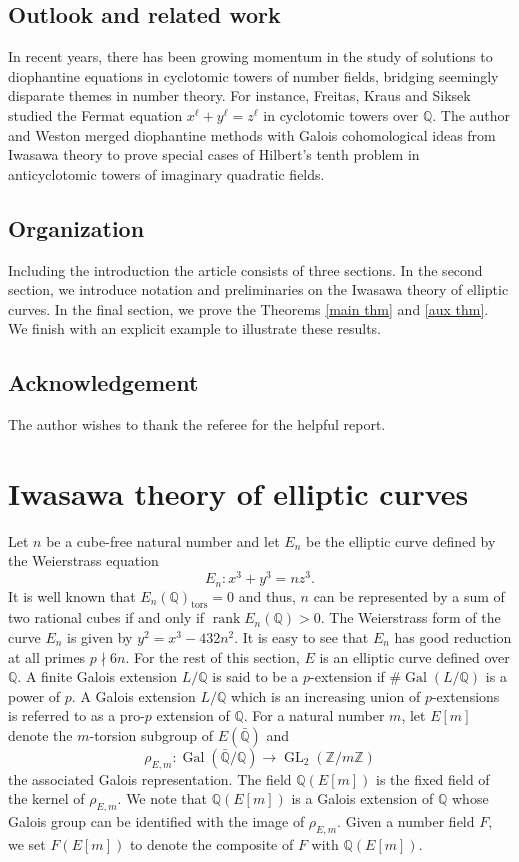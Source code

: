 \documentclass[11pt]{amsart}
\newcommand{\Z}{\mathbb{Z}}
\newcommand{\Q}{\mathbb{Q}}
\newcommand{\op}[1]{\operatorname{#1}}
\numberwithin{equation}{section}
\begin{document}
\subsection{Outlook and related work} In recent years, there has been growing momentum in the study of solutions to diophantine equations in cyclotomic towers of number fields, bridging seemingly disparate themes in number theory. For instance, Freitas, Kraus and Siksek \cite{FKS1, FKS2} studied the Fermat equation $x^\ell+y^\ell=z^\ell$ in cyclotomic towers over $\Q$. The author and Weston merged diophantine methods with Galois cohomological ideas from Iwasawa theory \cite{RayWeston} to prove special cases of Hilbert's tenth problem in anticyclotomic towers of imaginary quadratic fields.  

\subsection{Organization} Including the introduction the article consists of three sections.  In the second section,  we introduce notation and preliminaries on the Iwasawa theory of elliptic curves.  In the final section,  we prove the Theorems \ref{main thm} and \ref{aux thm}. We finish with an explicit example to illustrate these results. 
\subsection*{Acknowledgement} The author wishes to thank the referee for the helpful report.

\section{Iwasawa theory of elliptic curves}
\par Let $n$ be a cube-free natural number and let $E_n$ be the elliptic curve defined by the Weierstrass equation 
\[E_n: x^3+y^3=nz^3.\]
It is well known that $E_n(\Q)_{\op{tors}}=0$ and thus, $n$ can be represented by a sum of two rational cubes if and only if $\op{rank}E_n(\Q)>0$. The Weierstrass form of the curve $E_n$ is given by $y^2=x^3-432n^2$. It is easy to see that $E_n$ has good reduction at all primes $p\nmid 6n$. For the rest of this section, $E$ is an elliptic curve defined over $\Q$. A finite Galois extension $L/\Q$ is said to be a $p$-extension if $\#\op{Gal}(L/\Q)$ is a power of $p$.  A Galois extension $L/\Q$ which is an increasing union of $p$-extensions is referred to as a pro-$p$ extension of $\Q$.  For a natural number $m$,  let $E[m]$ denote the $m$-torsion subgroup of $E(\bar{\Q})$ and 
\[\rho_{E,m}:\op{Gal}(\bar{\Q}/\Q)\rightarrow \op{GL}_2(\Z/m\Z)\]the associated Galois representation.  The field $\Q(E[m])$ is the fixed field of the kernel of $\rho_{E,m}$. We note that $\Q(E[m])$ is a Galois extension of $\Q$ whose Galois group can be identified with the image of $\rho_{E,m}$.  Given a number field $F$,  we set $F(E[m])$ to denote the composite of $F$ with $\Q(E[m])$.
\end{document}
